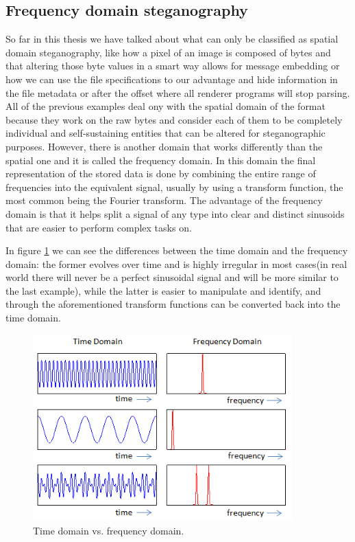 \subsection{Frequency domain steganography}
So far in this thesis we have talked about what can only be classified as spatial domain steganography, like how a pixel of an image is composed of bytes and that altering those byte values in a smart way allows for message embedding or how we can use the file specifications to our advantage and hide information in the file metadata or after the offset where all renderer programs will stop parsing. All of the previous examples deal ony with the spatial domain of the format because they work on the raw bytes and consider each of them to be completely individual and self-sustaining entities that can be altered for steganographic purposes. However, there is another domain that works differently than the spatial one and it is called the frequency domain. In this domain the final representation of the stored data is done by combining the entire range of frequencies into the equivalent signal, usually by using a transform function, the most common being the Fourier transform. The advantage of the frequency domain is that it helps split a signal of any type into clear and distinct sinusoids that are easier to perform complex tasks on. 

In figure \ref{time_vs_frequency_comparison} we can see the differences between the time domain and the frequency domain: the former evolves over time and is highly irregular in most cases(in real world there will never be a perfect sinusoidal signal and will be more similar to the last example), while the latter is easier to manipulate and identify, and through the aforementioned transform functions can be converted back into the time domain.
\begin{figure}[H]
    \centering
    \includegraphics[width=10cm,keepaspectratio]{pics/audio_chapter/time_vs_frequency_domains.png}
    \caption{Time domain vs. frequency domain.}
    \label{time_vs_frequency_comparison}
\end{figure}

